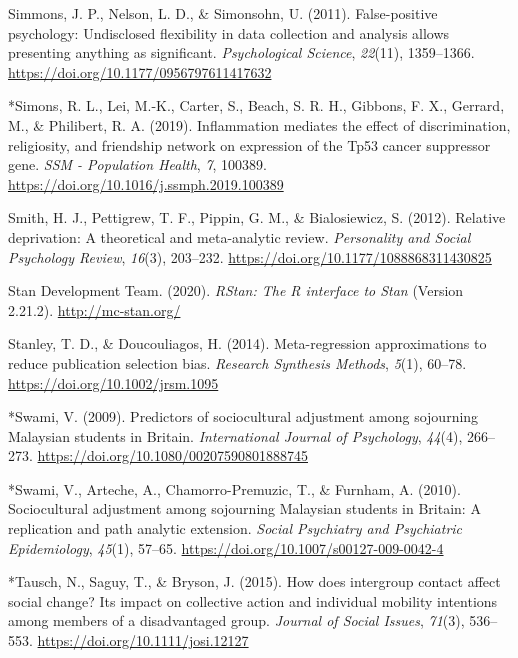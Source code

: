 \documentclass[12pt, letterpaper]{article}
\begin{document}
\leavevmode\hypertarget{ref-simmons_false-positive_2011}{}%
Simmons, J. P., Nelson, L. D., \& Simonsohn, U. (2011). False-positive
psychology: Undisclosed flexibility in data collection and analysis
allows presenting anything as significant. \emph{Psychological Science},
\emph{22}(11), 1359--1366.
\url{https://doi.org/10.1177/0956797611417632}

\leavevmode\hypertarget{ref-3060}{}%
*Simons, R. L., Lei, M.-K., Carter, S., Beach, S. R. H., Gibbons, F. X.,
Gerrard, M., \& Philibert, R. A. (2019). Inflammation mediates the
effect of discrimination, religiosity, and friendship network on
expression of the Tp53 cancer suppressor gene. \emph{SSM - Population
Health}, \emph{7}, 100389.
\url{https://doi.org/10.1016/j.ssmph.2019.100389}

\leavevmode\hypertarget{ref-smith_relative_2012}{}%
Smith, H. J., Pettigrew, T. F., Pippin, G. M., \& Bialosiewicz, S.
(2012). Relative deprivation: A theoretical and meta-analytic review.
\emph{Personality and Social Psychology Review}, \emph{16}(3), 203--232.
\url{https://doi.org/10.1177/1088868311430825}

\leavevmode\hypertarget{ref-stan_development_team_rstan:_2020}{}%
Stan Development Team. (2020). \emph{RStan: The R interface to Stan}
(Version 2.21.2). \url{http://mc-stan.org/}

\leavevmode\hypertarget{ref-stanley_meta-regression_2014}{}%
Stanley, T. D., \& Doucouliagos, H. (2014). Meta-regression
approximations to reduce publication selection bias. \emph{Research
Synthesis Methods}, \emph{5}(1), 60--78.
\url{https://doi.org/10.1002/jrsm.1095}

\leavevmode\hypertarget{ref-1020}{}%
*Swami, V. (2009). Predictors of sociocultural adjustment among
sojourning Malaysian students in Britain. \emph{International Journal of
Psychology}, \emph{44}(4), 266--273.
\url{https://doi.org/10.1080/00207590801888745}

\leavevmode\hypertarget{ref-733}{}%
*Swami, V., Arteche, A., Chamorro-Premuzic, T., \& Furnham, A. (2010).
Sociocultural adjustment among sojourning Malaysian students in Britain:
A replication and path analytic extension. \emph{Social Psychiatry and
Psychiatric Epidemiology}, \emph{45}(1), 57--65.
\url{https://doi.org/10.1007/s00127-009-0042-4}

\leavevmode\hypertarget{ref-2375}{}%
*Tausch, N., Saguy, T., \& Bryson, J. (2015). How does intergroup
contact affect social change? Its impact on collective action and
individual mobility intentions among members of a disadvantaged group.
\emph{Journal of Social Issues}, \emph{71}(3), 536--553.
\url{https://doi.org/10.1111/josi.12127}
\end{document}

